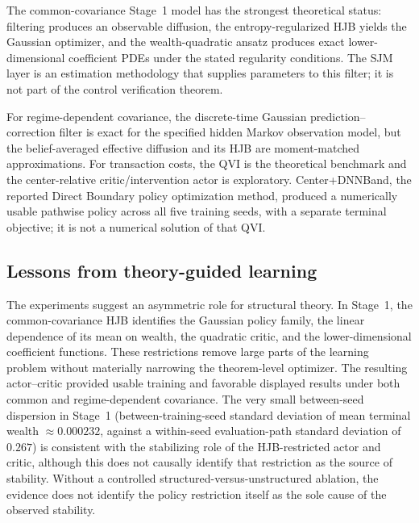 \documentclass[a4paper,10pt]{article}
\begin{document}
The common-covariance Stage~1 model has the strongest theoretical status: filtering produces an observable diffusion, the entropy-regularized HJB yields the Gaussian optimizer, and the wealth-quadratic ansatz produces exact lower-dimensional coefficient PDEs under the stated regularity conditions. The SJM layer is an estimation methodology that supplies parameters to this filter; it is not part of the control verification theorem.

For regime-dependent covariance, the discrete-time Gaussian prediction--correction filter is exact for the specified hidden Markov observation model, but the belief-averaged effective diffusion and its HJB are moment-matched approximations. For transaction costs, the QVI is the theoretical benchmark and the center-relative critic/intervention actor is exploratory. Center+DNNBand, the reported Direct Boundary policy optimization method, produced a numerically usable pathwise policy across all five training seeds, with a separate terminal objective; it is not a numerical solution of that QVI.

\subsection{Lessons from theory-guided learning}

The experiments suggest an asymmetric role for structural theory. In Stage~1, the common-covariance HJB identifies the Gaussian policy family, the linear dependence of its mean on wealth, the quadratic critic, and the lower-dimensional coefficient functions. These restrictions remove large parts of the learning problem without materially narrowing the theorem-level optimizer. The resulting actor--critic provided usable training and favorable displayed results under both common and regime-dependent covariance. The very small between-seed dispersion in Stage~1 (between-training-seed standard deviation of mean terminal wealth $\approx 0.000232$, against a within-seed evaluation-path standard deviation of $0.267$) is consistent with the stabilizing role of the HJB-restricted actor and critic, although this does not causally identify that restriction as the source of stability. Without a controlled structured-versus-unstructured ablation, the evidence does not identify the policy restriction itself as the sole cause of the observed stability.
\end{document}
